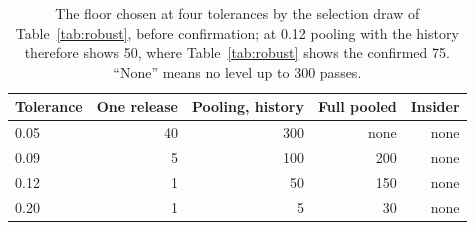\begin{table}[t]
\centering
\caption{The floor chosen at four tolerances by the selection draw of Table~\ref{tab:robust}, before confirmation; at 0.12 pooling with the history therefore shows 50, where Table~\ref{tab:robust} shows the confirmed 75. ``None'' means no level up to 300 passes.}
\label{tab:tolerance-floors}
\small
\begin{tabular}{lrrrr}
\toprule
Tolerance & One release & Pooling, history & Full pooled & Insider \\
\midrule
0.05 & 40 & 300 & none & none \\
0.09 & 5 & 100 & 200 & none \\
0.12 & 1 & 50 & 150 & none \\
0.20 & 1 & 5 & 30 & none \\
\bottomrule
\end{tabular}
\end{table}
